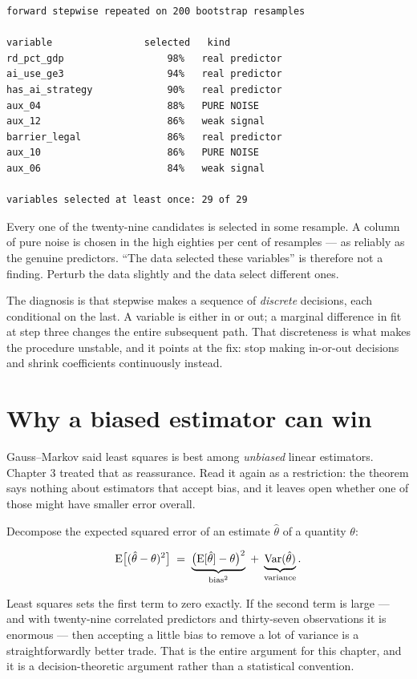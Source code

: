 \documentclass[
  letterpaper,
  10pt,
  twoside,
  openright,
  numbers=noenddot,
  chapterprefix=true]{scrbook}
\begin{document}
\begin{verbatim}
forward stepwise repeated on 200 bootstrap resamples

variable                selected   kind
rd_pct_gdp                  98%   real predictor
ai_use_ge3                  94%   real predictor
has_ai_strategy             90%   real predictor
aux_04                      88%   PURE NOISE
aux_12                      86%   weak signal
barrier_legal               86%   real predictor
aux_10                      86%   PURE NOISE
aux_06                      84%   weak signal

variables selected at least once: 29 of 29
\end{verbatim}

Every one of the twenty-nine candidates is selected in some resample. A
column of pure noise is chosen in the high eighties per cent of
resamples --- as reliably as the genuine predictors. ``The data selected
these variables'' is therefore not a finding. Perturb the data slightly
and the data select different ones.

The diagnosis is that stepwise makes a sequence of \emph{discrete}
decisions, each conditional on the last. A variable is either in or out;
a marginal difference in fit at step three changes the entire subsequent
path. That discreteness is what makes the procedure unstable, and it
points at the fix: stop making in-or-out decisions and shrink
coefficients continuously instead.

\section{Why a biased estimator can
win}\label{why-a-biased-estimator-can-win}

Gauss--Markov said least squares is best among \emph{unbiased} linear
estimators. Chapter 3 treated that as reassurance. Read it again as a
restriction: the theorem says nothing about estimators that accept bias,
and it leaves open whether one of those might have smaller error
overall.

Decompose the expected squared error of an estimate \(\hat\theta\) of a
quantity \(\theta\):

\[
\mathrm{E}\big[(\hat\theta - \theta)^2\big]
\thickspace=\thickspace
\underbrace{\big(\mathrm{E}[\hat\theta] - \theta\big)^2}_{\text{bias}^2}
\thickspace+\thickspace
\underbrace{\mathrm{Var}(\hat\theta)}_{\text{variance}} .
\]

Least squares sets the first term to zero exactly. If the second term is
large --- and with twenty-nine correlated predictors and thirty-seven
observations it is enormous --- then accepting a little bias to remove a
lot of variance is a straightforwardly better trade. That is the entire
argument for this chapter, and it is a decision-theoretic argument
rather than a statistical convention.
\end{document}
